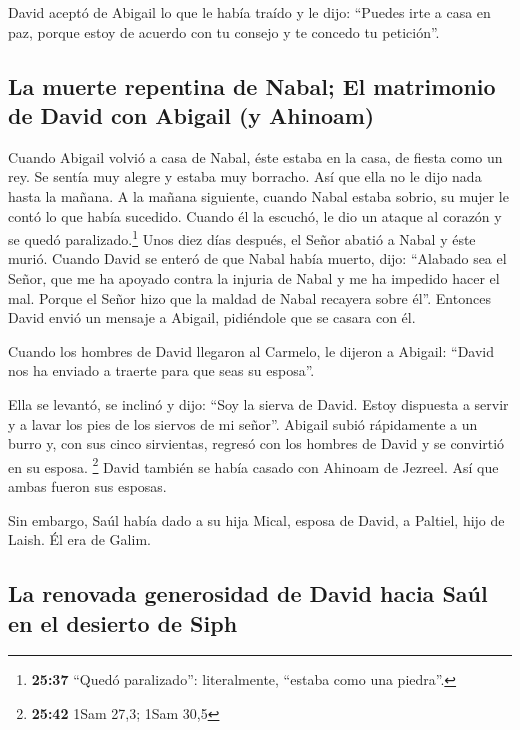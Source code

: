  David aceptó de Abigail lo que le había traído y le
dijo: ``Puedes irte a casa en paz, porque estoy de acuerdo con tu
consejo y te concedo tu petición''.

\hypertarget{la-muerte-repentina-de-nabal-el-matrimonio-de-david-con-abigail-y-ahinoam}{%
\subsection{La muerte repentina de Nabal; El matrimonio de David con
Abigail (y
Ahinoam)}\label{la-muerte-repentina-de-nabal-el-matrimonio-de-david-con-abigail-y-ahinoam}}

 Cuando Abigail volvió a casa de Nabal, éste estaba en la
casa, de fiesta como un rey. Se sentía muy alegre y estaba muy borracho.
Así que ella no le dijo nada hasta la mañana.  A la
mañana siguiente, cuando Nabal estaba sobrio, su mujer le contó lo que
había sucedido. Cuando él la escuchó, le dio un ataque al corazón y se
quedó paralizado.\footnote{\textbf{25:37} ``Quedó paralizado'':
  literalmente, ``estaba como una piedra''.}  Unos diez
días después, el Señor abatió a Nabal y éste murió. 
Cuando David se enteró de que Nabal había muerto, dijo: ``Alabado sea el
Señor, que me ha apoyado contra la injuria de Nabal y me ha impedido
hacer el mal. Porque el Señor hizo que la maldad de Nabal recayera sobre
él''. Entonces David envió un mensaje a Abigail, pidiéndole que se
casara con él.

 Cuando los hombres de David llegaron al Carmelo, le
dijeron a Abigail: ``David nos ha enviado a traerte para que seas su
esposa''.

 Ella se levantó, se inclinó y dijo: ``Soy la sierva de
David. Estoy dispuesta a servir y a lavar los pies de los siervos de mi
señor''.  Abigail subió rápidamente a un burro y, con sus
cinco sirvientas, regresó con los hombres de David y se convirtió en su
esposa. \footnote{\textbf{25:42} 1Sam 27,3; 1Sam 30,5} 
David también se había casado con Ahinoam de Jezreel. Así que ambas
fueron sus esposas.

 Sin embargo, Saúl había dado a su hija Mical, esposa de
David, a Paltiel, hijo de Laish. Él era de Galim.

\hypertarget{la-renovada-generosidad-de-david-hacia-sauxfal-en-el-desierto-de-siph}{%
\subsection{La renovada generosidad de David hacia Saúl en el desierto
de
Siph}\label{la-renovada-generosidad-de-david-hacia-sauxfal-en-el-desierto-de-siph}}

